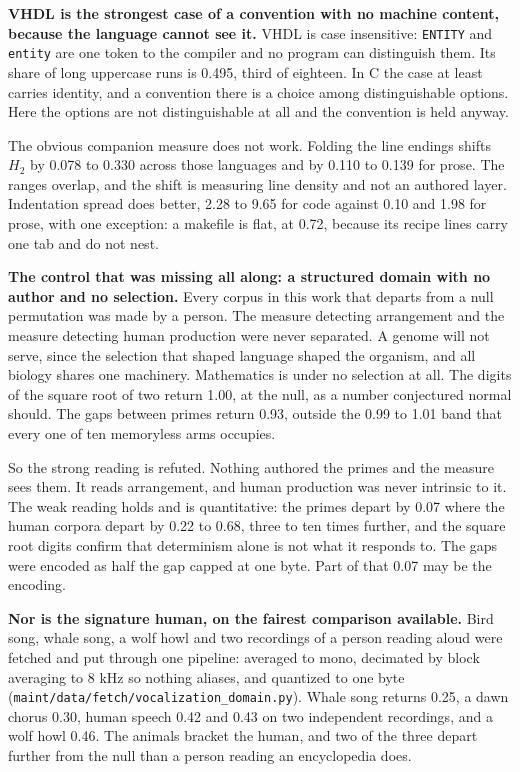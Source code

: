 \textbf{VHDL is the strongest case of a convention with no machine content, because the language cannot see it.} VHDL is case insensitive: \texttt{ENTITY} and \texttt{entity} are one token to the compiler and no program can distinguish them. Its share of long uppercase runs is 0.495, third of eighteen. In C the case at least carries identity, and a convention there is a choice among distinguishable options. Here the options are not distinguishable at all and the convention is held anyway.

The obvious companion measure does not work. Folding the line endings shifts \(H_2\) by 0.078 to 0.330 across those languages and by 0.110 to 0.139 for prose. The ranges overlap, and the shift is measuring line density and not an authored layer. Indentation spread does better, 2.28 to 9.65 for code against 0.10 and 1.98 for prose, with one exception: a makefile is flat, at 0.72, because its recipe lines carry one tab and do not nest.

\textbf{The control that was missing all along: a structured domain with no author and no selection.} Every corpus in this work that departs from a null permutation was made by a person. The measure detecting arrangement and the measure detecting human production were never separated. A genome will not serve, since the selection that shaped language shaped the organism, and all biology shares one machinery. Mathematics is under no selection at all. The digits of the square root of two return 1.00, at the null, as a number conjectured normal should. The gaps between primes return 0.93, outside the 0.99 to 1.01 band that every one of ten memoryless arms occupies.

So the strong reading is refuted. Nothing authored the primes and the measure sees them. It reads arrangement, and human production was never intrinsic to it. The weak reading holds and is quantitative: the primes depart by 0.07 where the human corpora depart by 0.22 to 0.68, three to ten times further, and the square root digits confirm that determinism alone is not what it responds to. The gaps were encoded as half the gap capped at one byte. Part of that 0.07 may be the encoding.

\textbf{Nor is the signature human, on the fairest comparison available.} Bird song, whale song, a wolf howl and two recordings of a person reading aloud were fetched and put through one pipeline: averaged to mono, decimated by block averaging to 8 kHz so nothing aliases, and quantized to one byte (\texttt{maint/\allowbreak{}data/\allowbreak{}fetch/\allowbreak{}vocalization\_\allowbreak{}domain.\allowbreak{}py}). Whale song returns 0.25, a dawn chorus 0.30, human speech 0.42 and 0.43 on two independent recordings, and a wolf howl 0.46. The animals bracket the human, and two of the three depart further from the null than a person reading an encyclopedia does.

